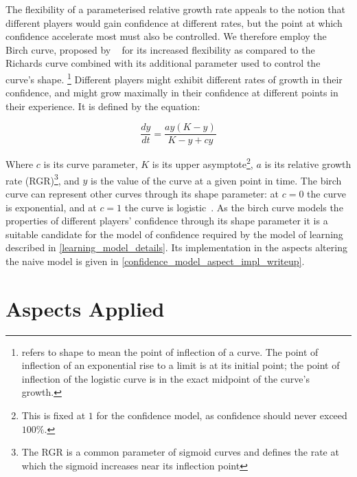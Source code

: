 The flexibility of a parameterised relative growth rate appeals to the notion
that different players would gain confidence at different rates, but the point
at which confidence accelerate most must also be controlled. We therefore employ
the Birch curve, proposed by \citeauthor{birch1999new}~\cite{birch1999new} for
its increased flexibility as compared to the Richards curve combined with its
additional parameter used to control the curve's shape.
\footnote{\citet{birch1999new} refers to shape to mean the point of
inflection of a curve. The point of inflection of an exponential rise to a limit
is at its initial point; the point of inflection of the logistic curve is in the
exact midpoint of the curve's growth.} Different players might exhibit different
rates of growth in their confidence, and might grow maximally in their
confidence at different points in their experience. It is defined by the
equation:

\[\frac{dy}{dt} = \frac{ay(K-y)}{K-y+cy}\]

Where $c$ is its curve parameter, $K$ is its upper asymptote\footnote{This is
fixed at $1$ for the confidence model, as confidence should never exceed
$100\%$.}, $a$ is its relative growth rate (RGR)\footnote{The RGR is a common
parameter of sigmoid curves and defines the rate at which the sigmoid increases
near its inflection point}, and $y$ is the value of the curve at a given point
in time. The birch curve can represent other curves through its shape parameter:
at $c=0$ the curve is exponential, and at $c=1$ the curve is
logistic~\cite{birch1999new}. As the birch curve models the properties of
different players' confidence through its shape parameter it is a suitable
candidate for the model of confidence required by the model of learning
described in \cref{learning_model_details}. Its implementation in the aspects
altering the naive model is given in
\cref{confidence_model_aspect_impl_writeup}.


\section{Aspects Applied}
\label{sec:optimisation_with_aspects_aspectsdeveloped}
\label{aspects_applied_section}




